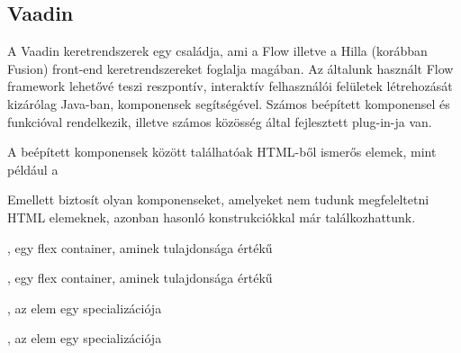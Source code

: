 \subsection{Vaadin}

A Vaadin keretrendszerek egy családja, ami a Flow illetve a Hilla (korábban Fusion) front-end keretrendszereket foglalja magában. Az általunk használt Flow framework lehetővé teszi reszpontív, interaktív felhasználói felületek létrehozását kizárólag Java-ban, komponensek segítségével. Számos beépített komponensel és funkcióval rendelkezik, illetve számos közösség által fejlesztett plug-in-ja van. \par

A beépített komponensek között találhatóak HTML-ből ismerős elemek, mint például a

\begin{listing}
	\item {}
	\item {}
	\item {}
	\item {}
	\item {}
	\item {}
\end{listing}

Emellett biztosít olyan komponenseket, amelyeket nem tudunk megfeleltetni HTML elemeknek, azonban hasonló konstrukciókkal már találkozhattunk.

\begin{listing}
	\item {}, egy flex container, aminek  tulajdonsága  értékű 
	\item {}, egy flex container, aminek  tulajdonsága  értékű 
	\item {}, az  elem egy specializációja
	\item {}, az  elem egy specializációja
\end{listing}